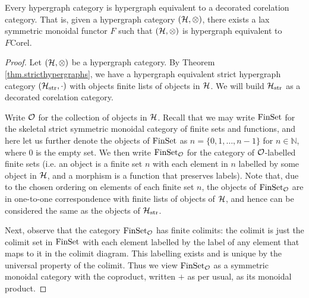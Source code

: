 \begin{theorem}\label{thm.hypdeccorcats}
  Every hypergraph category is hypergraph equivalent to a decorated corelation
  category. That is, given a hypergraph category $(\mathcal H,\otimes)$, there exists
  a lax symmetric monoidal functor $F$ such that $(\mathcal H,\otimes)$ is hypergraph
  equivalent to $F\mathrm{Corel}$.
\end{theorem}
\begin{proof}
  Let $(\mathcal H,\otimes)$ be a hypergraph category. By Theorem
  \ref{thm.stricthypergraphs}, we have a hypergraph equivalent strict hypergraph
  category $(\mathcal H_{\mathrm{str}},\cdot)$ with objects finite lists of objects
  in $\mathcal H$. We will build $\mathcal H_{\mathrm{str}}$ as a decorated corelation
  category.

  Write $\mathcal O$ for the collection of objects in $\mathcal H$.  Recall that we may
  write $\mathrm{FinSet}$ for the skeletal strict symmetric monoidal category of finite
  sets and functions, and here let us further denote the objects of $\mathrm{FinSet}$ as
  $n= \{0,1,\dots,n-1\}$ for $n \in \mathbb N$, where $0$ is the empty set. We
  then write $\mathrm{FinSet}_{\mathcal O}$ for the category of $\mathcal O$-labelled finite sets
  (i.e.  an object is a finite set $n$ with each element in $n$ labelled by some
  object in $\mathcal H$, and a morphism is a function that preserves labels). Note
  that, due to the chosen ordering on elements of each finite set $n$, the
  objects of $\mathrm{FinSet}_{\mathcal O}$ are in one-to-one correspondence with finite
  lists of objects of $\mathcal H$, and hence can be considered the same as the
  objects of $\mathcal H_{\mathrm{str}}$.
  
  Next, observe that the category $\mathrm{FinSet}_{\mathcal O}$ has finite colimits: the
  colimit is just the colimit set in $\mathrm{FinSet}$ with each element labelled by the
  label of any element that maps to it in the colimit diagram. This labelling
  exists and is unique by the universal property of the colimit. Thus we view
  $\mathrm{FinSet}_{\mathcal O}$ as a symmetric monoidal category with the coproduct, written
  $+$ as per usual, as its monoidal product.  


\end{proof}
